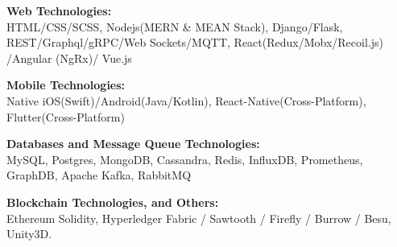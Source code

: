 \documentclass{article}
\begin{document}
\noindent \normalsize \textbf{Web Technologies:} \\
\noindent \normalsize HTML/CSS/SCSS, Nodejs(MERN \& MEAN Stack), Django/Flask, REST/Graphql/gRPC/Web Sockets/MQTT, React(Redux/Mobx/Recoil.js) /Angular (NgRx)/ Vue.js
\vspace{3pt}

\noindent \normalsize \textbf{Mobile Technologies:} \\
\noindent \normalsize Native iOS(Swift)/Android(Java/Kotlin), React-Native(Cross-Platform), Flutter(Cross-Platform)
\vspace{3pt}

\noindent \normalsize \textbf{Databases and Message Queue Technologies:} \\
\noindent \normalsize MySQL, Postgres, MongoDB, Cassandra, Redis, InfluxDB, Prometheus, GraphDB, Apache Kafka, RabbitMQ
\vspace{3pt}

\noindent \normalsize \textbf{Blockchain Technologies, and Others:}\\
\noindent \normalsize Ethereum Solidity, Hyperledger Fabric / Sawtooth / Firefly / Burrow / Besu, Unity3D.
\end{document}
